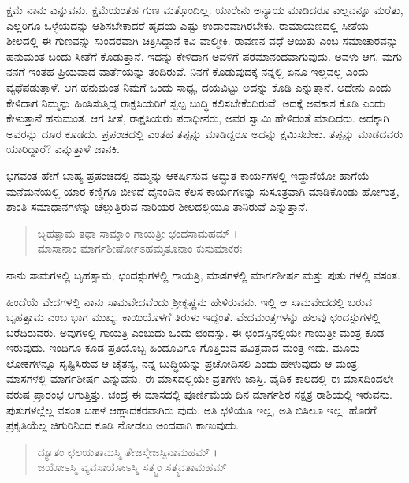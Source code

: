 ಕ್ಷಮೆ ನಾನು ಎನ್ನುವನು. ಕ್ಷಮೆಯಂತಹ ಗುಣ ಮತ್ತೊಂದಿಲ್ಲ. ಯಾರೇನು ಅನ್ಯಾಯ ಮಾಡಿದರೂ ಎಲ್ಲವನ್ನೂ ಮರೆತು, ಎಲ್ಲರಿಗೂ ಒಳ್ಳೆಯದನ್ನು ಆಶಿಸಬೇಕಾದರೆ ಹೃದಯ ಎಷ್ಟು ಉದಾರವಾಗಿರಬೇಕು. ರಾಮಾಯಣದಲ್ಲಿ ಸೀತೆಯ ಶೀಲದಲ್ಲಿ ಈ ಗುಣವನ್ನು ಸುಂದರವಾಗಿ ಚಿತ್ರಿಸಿದ್ದಾನೆ ಕವಿ ವಾಲ್ಮೀಕಿ. ರಾವಣನ ವಧೆ ಆಯಿತು ಎಂಬ ಸಮಾಚಾರವನ್ನು ಹನುಮಂತ ಬಂದು ಸೀತೆಗೆ ಕೊಡುತ್ತಾನೆ. ಇದನ್ನು ಕೇಳಿದಾಗ ಅವಳಿಗೆ ಪರಮಾನಂದವಾಗುವುದು. ಅವಳು ಆಗ, ಮಗು ನನಗೆ ಇಂತಹ ಪ್ರಿಯವಾದ ವಾರ್ತೆಯನ್ನು ತಂದಿರುವೆ. ನಿನಗೆ ಕೊಡುವುದಕ್ಕೆ ನನ್ನಲ್ಲಿ ಏನೂ ಇಲ್ಲವಲ್ಲ ಎಂದು ವ್ಯಥೆಪಡುತ್ತಾಳೆ. ಆಗ ಹನುಮಂತ ನಿಮಗೆ ಒಂದು ಸಾಧ್ಯ, ದಯವಿಟ್ಟು ಅದನ್ನು ಕೊಡಿ ಎನ್ನುತ್ತಾನೆ. ಅದೇನು ಎಂದು ಕೇಳಿದಾಗ ನಿಮ್ಮನ್ನು ಹಿಂಸಿಸುತ್ತಿದ್ದ ರಾಕ್ಷಸಿಯರಿಗೆ ಸ್ವಲ್ಪ ಬುದ್ಧಿ ಕಲಿಸಬೇಕೆಂದಿರುವೆ. ಅದಕ್ಕೆ ಅವಕಾಶ ಕೊಡಿ ಎಂದು ಕೇಳುತ್ತಾನೆ ಹನುಮಂತ. ಆಗ ಸೀತೆ, ರಾಕ್ಷಸಿಯರು ಪರಾಧೀನರು, ಅವರ ಸ್ವಾಮಿ ಹೇಳಿದಂತೆ ಮಾಡಿದರು. ಅದಕ್ಕಾಗಿ ಅವರನ್ನು ದೂರ ಕೂಡದು. ಪ್ರಪಂಚದಲ್ಲಿ ಎಂತಹ ತಪ್ಪನ್ನು ಮಾಡಿದ್ದರೂ ಅದನ್ನು ಕ್ಷಮಿಸಬೇಕು. ತಪ್ಪನ್ನು ಮಾಡದವರು ಯಾರಿದ್ದಾರೆ? ಎನ್ನುತ್ತಾಳೆ ಜಾನಕಿ.

ಭಗವಂತ ಹೇಗೆ ಬಾಹ್ಯ ಪ್ರಪಂಚದಲ್ಲಿ ನಮ್ಮನ್ನು ಆಕರ್ಷಿಸುವ ಅದ್ಭುತ ಕಾರ್ಯಗಳಲ್ಲಿ ಇದ್ದಾನೆಯೋ ಹಾಗೆಯೆ ಮನೆಮನೆಯಲ್ಲಿ ಯಾರ ಕಣ್ಣಿಗೂ ಬೀಳದೆ ದೈನಂದಿನ ಕೆಲಸ ಕಾರ್ಯಗಳನ್ನು ಸುಸೂತ್ರವಾಗಿ ಮಾಡಿಕೊಂಡು ಹೋಗುತ್ತ, ಶಾಂತಿ ಸಮಾಧಾನಗಳನ್ನು ಚೆಲ್ಲುತ್ತಿರುವ ನಾರಿಯರ ಶೀಲದಲ್ಲಿಯೂ ತಾನಿರುವೆ ಎನ್ನುತ್ತಾನೆ.

\begin{verse}
ಬೃಹತ್ಸಾಮ ತಥಾ ಸಾಮ್ನಾಂ ಗಾಯತ್ರೀ ಛಂದಸಾಮಹಮ್ ।\\ಮಾಸಾನಾಂ ಮಾರ್ಗಶೀರ್ಷೋಽಹಮೃತೂನಾಂ ಕುಸುಮಾಕರಃ 
\end{verse}

{\small ನಾನು ಸಾಮಗಳಲ್ಲಿ ಬೃಹತ್ಸಾಮ, ಛಂದಸ್ಸುಗಳಲ್ಲಿ ಗಾಯತ್ರಿ, ಮಾಸಗಳಲ್ಲಿ ಮಾರ್ಗಶೀರ್ಷ ಮತ್ತು ಪುತು ಗಳಲ್ಲಿ ವಸಂತ.}

ಹಿಂದೆಯೆ ವೇದಗಳಲ್ಲಿ ನಾನು ಸಾಮವೇದವೆಂದು ಶ್ರೀಕೃಷ್ಣನು ಹೇಳಿರುವನು. ಇಲ್ಲಿ ಆ ಸಾಮವೇದದಲ್ಲಿ ಬರುವ ಬೃಹತ್ಸಾಮ ಎಂಬ ಭಾಗ ಮುಖ್ಯ. ಕಾಯಿಯೊಳಗೆ ತಿರುಳು ಇದ್ದಂತೆ. ವೇದಮಂತ್ರಗಳನ್ನು ಹಲವು ಛಂದಸ್ಸುಗಳಲ್ಲಿ ಬರೆದಿರುವರು. ಅವುಗಳಲ್ಲಿ ಗಾಯತ್ರಿ ಎಂಬುದು ಒಂದು ಛಂದಸ್ಸು. ಈ ಛಂದಸ್ಸಿನಲ್ಲಿಯೇ ಗಾಯತ್ರೀ ಮಂತ್ರ ಕೂಡ ಇರುವುದು. ಇಂದಿಗೂ ಕೂಡ ಪ್ರತಿಯೊಬ್ಬ ಹಿಂದೂವಿಗೂ ಗೊತ್ತಿರುವ ಪವಿತ್ರವಾದ ಮಂತ್ರ ಇದು. ಮೂರು ಲೋಕಗಳನ್ನೂ ಸೃಷ್ಟಿಸಿರುವ ಆ ಚೈತನ್ಯ, ನನ್ನ ಬುದ್ಧಿಯನ್ನು ಪ್ರಚೋದಿಸಲಿ ಎಂದು ಹೇಳುವುದು ಆ ಮಂತ್ರ. ಮಾಸಗಳಲ್ಲಿ ಮಾರ್ಗಶೀರ್ಷ ಎನ್ನುವನು. ಈ ಮಾಸದಲ್ಲಿಯೇ ವ್ರತಗಳು ಜಾಸ್ತಿ. ವೈದಿಕ ಕಾಲದಲ್ಲಿ ಈ ಮಾಸದಿಂದಲೇ ವರುಷ ಪ್ರಾರಂಭ ಆಗುತ್ತಿತ್ತು. ಚಂದ್ರ ಈ ಮಾಸದಲ್ಲಿ ಪೂರ್ಣಿಮೆಯ ದಿನ ಮಾರ್ಗಶಿರ ನಕ್ಷತ್ರ ರಾಶಿಯಲ್ಲಿ ಇರುವನು. ಪುತುಗಳಲ್ಲೆಲ್ಲ ವಸಂತ ಬಹಳ ಆಹ್ಲಾದಕರವಾಗಿರು ವುದು. ಅತಿ ಛಳಿಯೂ ಇಲ್ಲ, ಅತಿ ಬಿಸಿಲೂ ಇಲ್ಲ. ಹೊರಗೆ ಪ್ರಕೃತಿಯೆಲ್ಲ ಚಿಗುರಿನಿಂದ ಕೂಡಿ ನೋಡಲು ಅಂದವಾಗಿ ಕಾಣುವುದು.

\begin{verse}
ದ್ಯೂತಂ ಛಲಯತಾಮಸ್ಮಿ ತೇಜಸ್ತೇಜಸ್ವಿನಾಮಹಮ್ ।\\ಜಯೋಽಸ್ಮಿ ವ್ಯವಸಾಯೋಽಸ್ಮಿ ಸತ್ತ್ವಂ ಸತ್ತ್ವವತಾಮಹಮ್ 
\end{verse}

